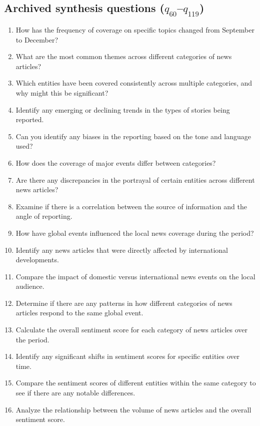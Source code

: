 \subsection{Archived synthesis questions
(\texorpdfstring{$q_{60}$--$q_{119}$}{q60-q119})}
\begin{footnotesize}
\begin{enumerate}[label={\(q_{\arabic*}\).},start=60]
\setlength{\itemsep}{1pt}
\item How has the frequency of coverage on specific topics changed from September to December?
\item What are the most common themes across different categories of news articles?
\item Which entities have been covered consistently across multiple categories, and why might this be significant?
\item Identify any emerging or declining trends in the types of stories being reported.
\item Can you identify any biases in the reporting based on the tone and language used?
\item How does the coverage of major events differ between categories?
\item Are there any discrepancies in the portrayal of certain entities across different news articles?
\item Examine if there is a correlation between the source of information and the angle of reporting.
\item How have global events influenced the local news coverage during the period?
\item Identify any news articles that were directly affected by international developments.
\item Compare the impact of domestic versus international news events on the local audience.
\item Determine if there are any patterns in how different categories of news articles respond to the same global event.
\item Calculate the overall sentiment score for each category of news articles over the period.
\item Identify any significant shifts in sentiment scores for specific entities over time.
\item Compare the sentiment scores of different entities within the same category to see if there are any notable differences.
\item Analyze the relationship between the volume of news articles and the overall sentiment score.

\end{enumerate}
\end{footnotesize}
